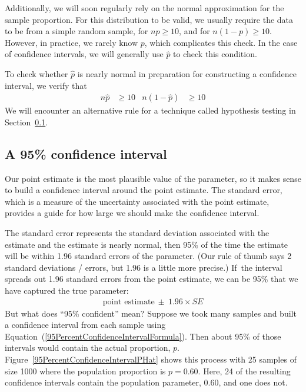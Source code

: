 Additionally, we will soon regularly rely on the normal approximation for the sample proportion. For this distribution to be valid, we usually require the data to be from a simple random sample, for $np \geq 10$, and for $n(1-p) \geq 10$. However, in practice, we rarely know $p$, which complicates this check. In the case of confidence intervals, we will generally use $\hat{p}$ to check this condition.

\begin{tipBox}{
To check whether $\hat{p}$ is nearly normal in preparation for constructing a confidence interval, we verify that
\begin{align*}
n\hat{p} &\geq 10
	& n(1 - \hat{p}) &\geq 10
\end{align*}
We will encounter an alternative rule for a technique called hypothesis testing in Section~\ref{}.}
\end{tipBox}


\subsection{A 95\% confidence interval}

Our point estimate is the most plausible value of the parameter, so it makes sense to build a confidence interval around the point estimate. The standard error, which is a measure of the uncertainty associated with the point estimate, provides a guide for how large we should make the confidence interval.

The standard error represents the standard deviation associated with the estimate and the estimate is nearly normal, then 95\% of the time the estimate will be within 1.96 standard errors of the parameter. (Our rule of thumb says 2 standard deviations / errors, but 1.96 is a little more precise.) If~the interval spreads out 1.96 standard errors from the point estimate, we can be 95\%  that we have captured the true parameter:
\begin{eqnarray}
\text{point estimate}\ \pm\ 1.96\times SE
\label{95PercentConfidenceIntervalFormula}
\end{eqnarray}
But what does ``95\% confident'' mean? Suppose we took many samples and built a confidence interval from each sample using Equation~(\ref{95PercentConfidenceIntervalFormula}). Then about 95\% of those intervals would contain the actual proportion, $p$. Figure~\ref{95PercentConfidenceIntervalPHat} shows this process with 25 samples of size 1000 where the population proportion is $p = 0.60$. Here, 24 of the resulting confidence intervals contain the population parameter, $0.60$, and one does not.

